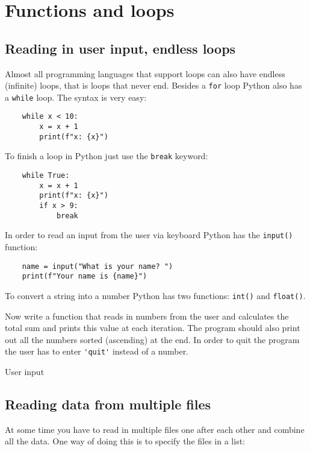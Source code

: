 \section{Functions and loops}

\subsection{Reading in user input, endless loops}
Almost all programming languages that support loops can also have endless (infinite) loops, that is loops that never end.
Besides a \verb|for| loop Python also has a \verb|while| loop. The syntax is very easy:

\begin{verbatim}
    while x < 10:
        x = x + 1
        print(f"x: {x}")
\end{verbatim}

To finish a loop in Python just use the \verb|break| keyword:

\begin{verbatim}
    while True:
        x = x + 1
        print(f"x: {x}")
        if x > 9:
            break
\end{verbatim}

In order to read an input from the user via keyboard Python has the \verb|input()| function:

\begin{verbatim}
    name = input("What is your name? ")
    print(f"Your name is {name}")
\end{verbatim}

To convert a string into a number Python has two functions: \verb|int()| and \verb|float()|.

Now write a function that reads in numbers from the user and calculates the total sum and prints this value at each iteration.
The program should also print out all the numbers sorted (ascending) at the end. In order to quit the program the user has to enter \verb|'quit'| instead of a number.

\ifanswers
\begin{tcolorbox}[enhanced jigsaw,breakable,pad at break*=1mm,
    colback=blue!5!white,colframe=babyblueeyes,title=Solutions,
    watermark color=white]
    User input
    
\end{tcolorbox}
\fi

\subsection{Reading data from multiple files}
At some time you have to read in multiple files one after each other and combine all the data.
One way of doing this is to specify the files in a list:

